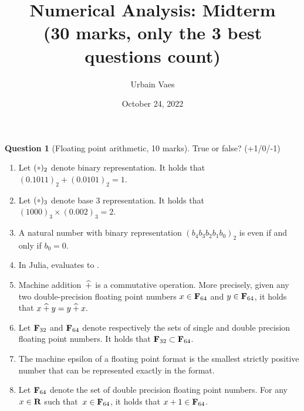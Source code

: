 \documentclass[11pt]{article}
\theoremstyle{definition}
\newtheorem{question}{Question}
\theoremstyle{remark}
\begin{document}
\title{Numerical Analysis: Midterm \\
\small{(\textbf{30 marks}, only the 3 best questions count)}}
\author{Urbain Vaes}
\date{October 24, 2022}
\maketitle

\begin{question}
    [Floating point arithmetic, 10 marks]
    True or false? (+1/0/-1)
    \begin{enumerate}
        \item
            Let $(\placeholder)_2$ denote binary representation.
            It holds that
            \(
                (0.1011)_2 + (0.0101)_2 = 1.
            \)

        \item
            Let $(\placeholder)_3$ denote base 3 representation.
            It holds that
            \(
                (1000)_3 \times (0.002)_3 = 2.
            \)

        \item
            A natural number with binary representation $(b_4 b_3 b_2 b_1 b_0)_2$ is even if and only if $b_0 = 0$.

        \item
            In Julia,  evaluates to .

        \item
            Machine addition~$\mathbin{\widehat +}$ is a commutative operation.
            More precisely, given any two double-precision floating point numbers $x \in \mathbf F_{64}$ and $y \in \mathbf F_{64}$,
            it holds that
            \(
                x \mathbin{\widehat +} y = y \mathbin{\widehat +} x.
            \)

        \item
            Let $\mathbf F_{32}$ and $\mathbf F_{64}$ denote respectively the sets of single and double precision floating point numbers.
            It holds that $\mathbf F_{32} \subset \mathbf F_{64}$.

        \item
            The machine epsilon of a floating point format is the smallest strictly positive number that can be represented exactly in the format.

        \item
            Let $\mathbf F_{64}$ denote the set of double precision floating point numbers.
            For any $x \in \mathbf R$ such that~$x \in \mathbf F_{64}$,
            it holds that $x + 1 \in \mathbf F_{64}$.


\end{enumerate}
\end{question}
\end{document}
